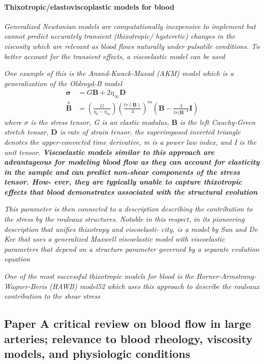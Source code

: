 \documentclass[11pt,letterpaper]{article}
\begin{document}
\paragraph{Thixotropic/elastoviscoplastic models for blood}
\textit{Generalized Newtonian models are computationally inexpensive to implement but cannot predict accurately transient (thixotropic/ hysteretic) changes in the viscosity which are relevant as blood flows naturally under pulsatile conditions. To better account for the transient effects, a viscoelastic model can be used}

\textit{One example of this is the Anand-Kwack-Masud (AKM) model which is a generalization of the Oldroyd-B model
\begin{align}
    \bm{\sigma} &= G \bm{B} + 2\eta_{\infty} \bm{D} \\
   \overset{\triangledown}{\bm{B}} &= (\frac{G}{\eta_0-\eta_{\infty}})(\frac{tr(\bm{B})}{3})^m(\bm{B}-\frac{3}{tr(\bm{B^{-1}}}\bm{I})
\end{align}
where $\sigma$ is the stress tensor, G is an elastic modulus, $\bm{B}$ is the left Cauchy-Green stretch tensor, $\bm{D}$  is rate of strain tensor, the superimposed inverted triangle denotes the upper-convected time derivative, m is a power law index, and I is the unit tensor. \textbf{Viscoelastic models similar to this approach are advantageous for modeling blood flow as they can account for elasticity in the sample and can predict non-shear components of the stress tensor. How- ever, they are typically unable to capture thixotropic effects that blood demonstrates associated with the structural evolution}
}

\textit{This parameter is then connected to a description describing the contribution to the stress by the rouleaux structures. Notable in this respect, in its pioneering description that unifies thixotropy and viscoelasti- city, is a model by Sun and De Kee that uses a generalized Maxwell viscoelastic model with viscoelastic parameters that depend on a structure parameter governed by a separate evolution equation}

\textit{One of the most successful thixotropic models for blood is
the Horner-Armstrong-Wagner-Beris (HAWB) model52 which uses this approach to describe the rouleaux contribution to the shear stress }



\subsection{Paper A critical review on blood  flow in large  arteries; relevance to blood rheology, viscosity models,  and physiologic  conditions}
\end{document}
